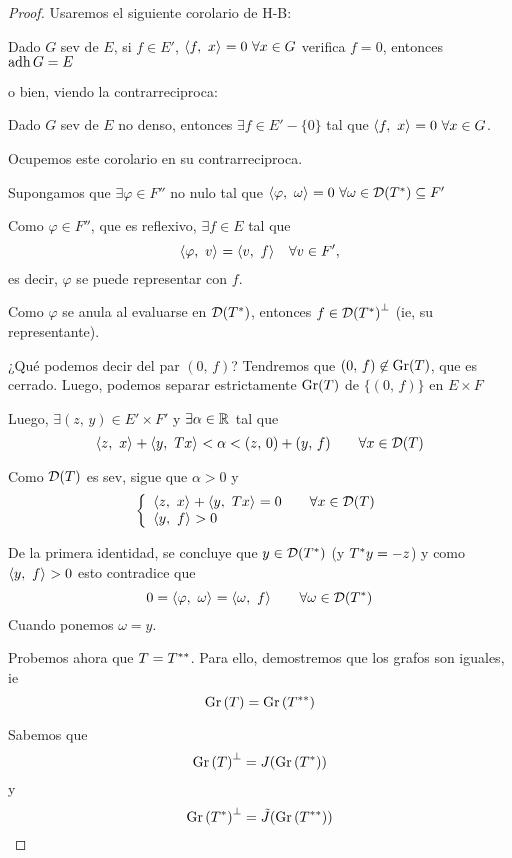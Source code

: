 \begin{proof}
Usaremos el siguiente corolario de H-B:
\begin{cor}
Dado $G$ sev de $E$, si $f \in E'$, $\prodint[]{f}{x} = 0 \ \forall x \in G$ verifica $f = 0$, entonces $\adh G = E$

o bien, viendo la contrarreciproca:

Dado $G$ sev de $E$ no denso, entonces $\exists f \in E' - \{ 0 \}$ tal que $\prodint[]{f}{x} = 0 \ \forall x \in G$.
\end{cor}

Ocupemos este corolario en su contrarreciproca.

Supongamos que $\exists \varphi \in F''$ no nulo tal que $\prodint[]{\varphi}{\omega} = 0 \ \forall \omega \in \cd(\adjc{T}) \subseteq F'$

Como $\varphi \in F''$, que es reflexivo, $\exists f \in E$ tal que $$
\prodint[]{\varphi}{v} = \prodint[]{v}{f} \quad \forall v \in F',
$$ es decir, $\varphi$ se puede representar con $f$.

Como $\varphi$ se anula al evaluarse en $\cd(\adjc{T})$, entonces $f \in \ortc{\cd(\adjc{T})}$ (ie, su representante).

¿Qué podemos decir del par $(0,\, f)$? Tendremos que $(0,\, f) \not \in \gr (T)$, que es cerrado. Luego, podemos separar estrictamente $\gr (T)$ de $\{ (0,\, f) \}$ en $E \times F$

Luego, $\exists (z,\, y) \in E' \times F'$ y $\exists \alpha \in \rr$ tal que $$
\prodint[]{z}{x} + \prodint[]{y}{Tx} 
< \alpha < (z,\, 0) + (y,\, f) \qquad \forall x \in \cd(T)
$$

Como $\cd(T)$ es sev, sigue que $\alpha>0$ y $$
\left\{
\begin{array}{l}
    \prodint[]{z}{x} + \prodint[]{y}{Tx} = 0 \qquad \forall x \in \cd(T) \\
    \prodint[]{y}{f} > 0
\end{array}\right.
$$

De la primera identidad, se concluye que $y \in \dom{\adjc{T}}$ (y $\adjc{T} y = - z$) y como $\prodint[]{y}{f} > 0$ esto contradice que $$
0 = \prodint[]{\varphi}{\omega} = \prodint[]{\omega}{f} \qquad \forall \omega \in \dom{\adjc{T}}
$$
Cuando ponemos  $\omega = y$.

Probemos ahora que $T = \dadjc{T}$. Para ello, demostremos que los grafos son iguales, ie $$
\graf{T}  = \graf{\dadjc{T}}
$$

Sabemos que $$
\ortc{\graf{T}} = J (\graf{\adjc{T}})
$$ y $$
\ortc{\graf{\adjc{T}}} = \Tilde{J} (\graf{\dadjc{T}})
$$


\end{proof}
